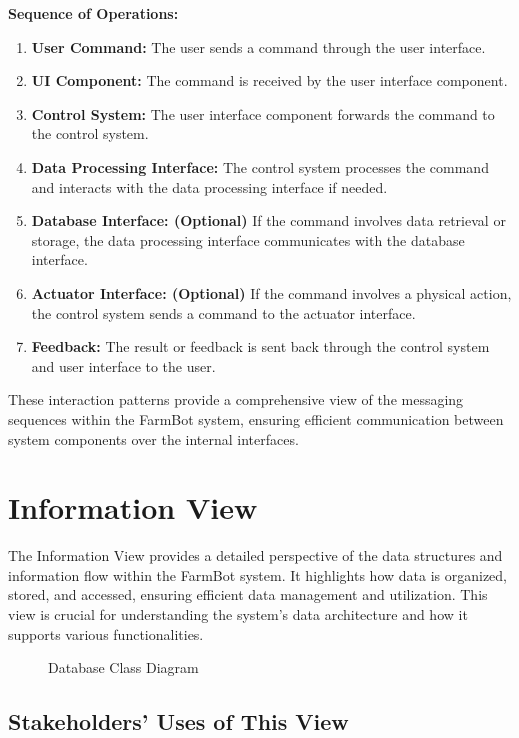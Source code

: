 \textbf{Sequence of Operations:}
\begin{enumerate}
    \item \textbf{User Command:} The user sends a command through the user interface.
    \item \textbf{UI Component:} The command is received by the user interface component.
    \item \textbf{Control System:} The user interface component forwards the command to the control system.
    \item \textbf{Data Processing Interface:} The control system processes the command and interacts with the data processing interface if needed.
    \item \textbf{Database Interface: (Optional)} If the command involves data retrieval or storage, the data processing interface communicates with the database interface.
    \item \textbf{Actuator Interface: (Optional)} If the command involves a physical action, the control system sends a command to the actuator interface.
    \item \textbf{Feedback:} The result or feedback is sent back through the control system and user interface to the user.
\end{enumerate}

These interaction patterns provide a comprehensive view of the messaging sequences within the FarmBot system, ensuring efficient communication between system components over the internal interfaces.




\section{Information View}

The Information View provides a detailed perspective of the data structures and information flow within the FarmBot system. It highlights how data is organized, stored, and accessed, ensuring efficient data management and utilization. This view is crucial for understanding the system's data architecture and how it supports various functionalities.

\begin{figure}[H]
    \centering
    
    \caption{Database Class Diagram}
\end{figure}

\subsection{Stakeholders’ Uses of This View}

